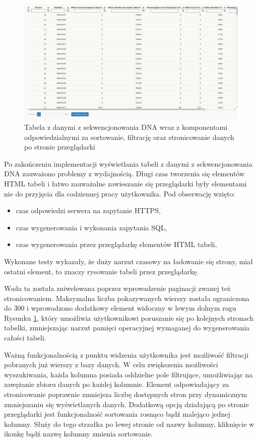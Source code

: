 \documentclass[a4paper,12pt,twoside]{article}
\begin{document}
\begin{figure}[h!]
\includegraphics[width=\linewidth]{obrazy/aplikacja/table1.png}
\caption{Tabela z danymi z sekwencjonowania DNA wraz z komponentami odpowiedzialnymi za sortowanie, filtrację oraz stronicowanie danych po stronie przeglądarki}
\label{fig:table1pic}
\end{figure}

Po zakończeniu implementacji wyświetlania tabeli z danymi z sekwencjonowania DNA zauważono problemy z wydajnością.
Długi czas tworzenia się elementów HTML tabeli i łatwo zauważalne zawieszanie się przeglądarki
były elementami nie do przyjęcia dla codziennej pracy użytkownika.
Pod obserwację wzięto:
\begin{itemize}
\item czas odpowiedzi serwera na zapytanie HTTPS,
\item czas wygenerowania i wykonania zapytania SQL,
\item czas wygenerowania przez przeglądarkę elementów HTML tabeli,
\end{itemize}
Wykonane testy wykazały, że duży narzut czasowy na ładowanie się strony, miał ostatni
element, to znaczy rysowanie tabeli przez przeglądarkę.

Wada ta została zniwelowana poprzez wprowadzenie paginacji zwanej też stronicowaniem.
Maksymalna liczba pokazywanych wierszy została ograniczona do 300 i wprowadzono dodatkowy
element widoczny w lewym dolnym rogu Rysunku \ref{fig:table1pic}, który umożliwia
użytkownikowi poruszanie się po kolejnych stronach tabelki, zmniejszając narzut
pamięci operacyjnej wymaganej do wygenerowania całości tabeli.
\newline

Ważną funkcjonalnością z punktu widzenia użytkownika jest możliwość filtracji pobranych już wierszy
z bazy danych. W celu zwiększenia możliwości wyszukiwania, każda kolumna posiada oddzielne pole
filtrujące, umożliwiając na zawężanie zbioru danych po każdej kolumnie. Element odpowiadający
za stronicowanie poprawnie zmniejsza liczbę dostępnych stron przy dynamicznym zmniejszaniu się
wyświetlanych danych.
Dodatkową opcją działającą po stronie przeglądarki jest
funkcjonalność sortowania rosnąco bądź malejąco jednej kolumny. Służy do tego strzałka po
lewej stronie od nazwy kolumny, kliknięcie w ikonkę bądź nazwę kolumny zmienia sortowanie.
\end{document}
